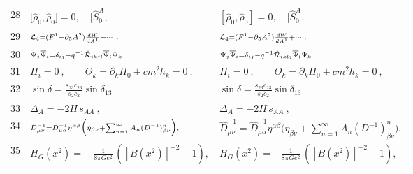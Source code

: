 \documentclass{article}
\begin{document}
\begin{figure*}[p]
\begin{tabular}{lll}
\scriptsize{28} & $\scriptstyle{\lbrack \hat { \rho } _ { 0 } , \hat { \rho } _ { 0 } ] = { 0 } , \quad \lbrack \hat { S } _ { 0 } ^ { A } , }$ & $\scriptstyle{[ \hat { \rho } _ { 0 } , \hat { \rho } _ { 0 } ] = 0 , \quad [ \hat { S } _ { 0 } ^ { A } , }$\\
\scriptsize{29} & $\scriptstyle{{ \cal L } _ { 4 } = ( F ^ { 1 } - \partial _ { 5 } A ^ { 2 } ) { \frac { d W } { d A ^ { 1 } } } + \cdots \ . }$ & $\scriptstyle{{ \cal L } _ { 4 } = ( F ^ { 1 } - \partial _ { 5 } A ^ { 2 } ) \frac { d W } { d A ^ { 1 } } + \cdots \; . }$\\
\scriptsize{30} & $\scriptstyle{\Psi _ { j } \overline { { \Psi } } _ { i } = \delta _ { i j } - q ^ { - 1 } \hat { { \cal R } } _ { i k j l } \overline { { \Psi } } _ { l } \Psi _ { k } }$ & $\scriptstyle{\Psi _ { j } \overline { { \Psi } } _ { i } = \delta _ { i j } - q ^ { - 1 } \hat { { \cal R } } _ { i k l j } \overline { { \Psi } } _ { l } \Psi _ { k } }$\\
\scriptsize{31} & $\scriptstyle{\Pi _ { i } = 0 \ , \qquad \Theta _ { k } = \partial _ { k } \Pi _ { 0 } + c m ^ { 2 } h _ { k } = 0 \ , }$ & $\scriptstyle{\Pi _ { i } = 0 \ , \qquad \Theta _ { k } = \partial _ { k } \Pi _ { 0 } + c m ^ { 2 } h _ { k } = 0 \ , }$\\
\scriptsize{32} & $\scriptstyle{\operatorname { s i n } \delta = \frac { s _ { 2 3 } c _ { 2 3 } } { s _ { 2 } c _ { 2 } } \operatorname { s i n } \delta _ { 1 3 } }$ & $\scriptstyle{\operatorname { s i n } \delta = \frac { s _ { 2 3 } c _ { 2 3 } } { s _ { 2 } c _ { 2 } } \operatorname { s i n } \delta _ { 1 3 } }$\\
\scriptsize{33} & $\scriptstyle{\Delta _ { A } = - 2 H \, s _ { A A } ~ , }$ & $\scriptstyle{\Delta _ { A } = - 2 H \, s _ { A A } \ , }$\\
\scriptsize{34} & $\scriptstyle{\hat { D } _ { \mu \nu } ^ { - 1 } = \hat { D } _ { \mu \alpha } ^ { - 1 } \eta ^ { \alpha \beta } \Bigl ( \eta _ { \beta \nu } + \sum _ { n = 1 } ^ { \infty } A _ { n } ( D ^ { - 1 } ) _ { \beta \nu } ^ { n } \Bigr ) , }$ & $\scriptstyle{\hat { D } _ { \mu \nu } ^ { - 1 } = \hat { D } _ { \mu \alpha } ^ { - 1 } \eta ^ { \alpha \beta } \Big ( \eta _ { \beta \nu } + \sum _ { n = 1 } ^ { \infty } A _ { n } ( D ^ { - 1 } ) _ { \beta \nu } ^ { n } \Big ) , }$\\
\scriptsize{35} & $\scriptstyle{H _ { G } ( x ^ { 2 } ) = - \, { \frac { 1 } { 8 \pi G e ^ { 2 } } } \, \left( [ B ( x ^ { 2 } ) ] ^ { - 2 } - 1 \right) , }$ & $\scriptstyle{H _ { G } ( x ^ { 2 } ) = - \frac { 1 } { 8 \pi G e ^ { 2 } } \, \left( [ B ( x ^ { 2 } ) ] ^ { - 2 } - 1 \right) , }$\\

\end{tabular}
\end{figure*}
\end{document}
